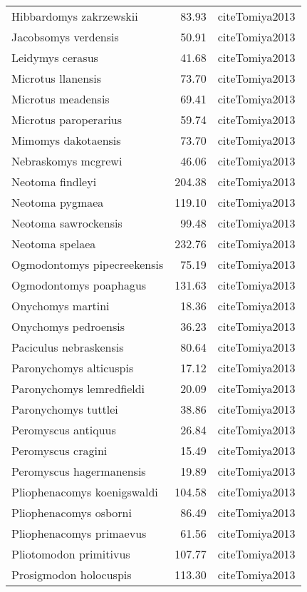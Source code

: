 \begin{table}[ht]
\begin{tabular}{lrl}
  Hibbardomys zakrzewskii & 83.93 & cite{Tomiya2013} \\ 
  Jacobsomys verdensis & 50.91 & cite{Tomiya2013} \\ 
  Leidymys cerasus & 41.68 & cite{Tomiya2013} \\ 
  Microtus llanensis & 73.70 & cite{Tomiya2013} \\ 
  Microtus meadensis & 69.41 & cite{Tomiya2013} \\ 
  Microtus paroperarius & 59.74 & cite{Tomiya2013} \\ 
  Mimomys dakotaensis & 73.70 & cite{Tomiya2013} \\ 
  Nebraskomys mcgrewi & 46.06 & cite{Tomiya2013} \\ 
  Neotoma findleyi & 204.38 & cite{Tomiya2013} \\ 
  Neotoma pygmaea & 119.10 & cite{Tomiya2013} \\ 
  Neotoma sawrockensis & 99.48 & cite{Tomiya2013} \\ 
  Neotoma spelaea & 232.76 & cite{Tomiya2013} \\ 
  Ogmodontomys pipecreekensis & 75.19 & cite{Tomiya2013} \\ 
  Ogmodontomys poaphagus & 131.63 & cite{Tomiya2013} \\ 
  Onychomys martini & 18.36 & cite{Tomiya2013} \\ 
  Onychomys pedroensis & 36.23 & cite{Tomiya2013} \\ 
  Paciculus nebraskensis & 80.64 & cite{Tomiya2013} \\ 
  Paronychomys alticuspis & 17.12 & cite{Tomiya2013} \\ 
  Paronychomys lemredfieldi & 20.09 & cite{Tomiya2013} \\ 
  Paronychomys tuttlei & 38.86 & cite{Tomiya2013} \\ 
  Peromyscus antiquus & 26.84 & cite{Tomiya2013} \\ 
  Peromyscus cragini & 15.49 & cite{Tomiya2013} \\ 
  Peromyscus hagermanensis & 19.89 & cite{Tomiya2013} \\ 
  Pliophenacomys koenigswaldi & 104.58 & cite{Tomiya2013} \\ 
  Pliophenacomys osborni & 86.49 & cite{Tomiya2013} \\ 
  Pliophenacomys primaevus & 61.56 & cite{Tomiya2013} \\ 
  Pliotomodon primitivus & 107.77 & cite{Tomiya2013} \\ 
  Prosigmodon holocuspis & 113.30 & cite{Tomiya2013} \\ 

\end{tabular}
\end{table}

